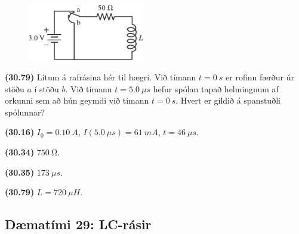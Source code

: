 \begin{enumerate}[label = \textbf{(\alph*)}]

\vspace{0.3cm}

\begin{minipage}{\linewidth}
\begin{figure}
\vspace{-0.5cm}
\includegraphics[width = 2in]{figures/rk3079.pdf}
\end{figure}

\item[\textbf{(30.79)}] Lítum á rafrásina hér til hægri. Við tímann $t = \SI{0}{s}$ er rofinn færður úr stöðu $a$ í stöðu $b$. Við tímann $t = \SI{5.0}{\mu s}$ hefur spólan tapað helmingnum af orkunni sem að hún geymdi við tímann $t = \SI{0}{s}$. Hvert er gildið á spanstuðli spólunnar?

\end{minipage}


\end{enumerate}

\vspace{0.75cm}

\begin{tcolorbox}
\begin{enumerate*}[label = ]
  \item \textbf{(30.16)} $I_0 = \SI{0.10}{A}$, $I(\SI{5.0}{\mu s}) = \SI{61}{mA}$, $t = \SI{46}{\mu s}$.
  \item \textbf{(30.34)} $\SI{750}{\ohm}$.
  \item \textbf{(30.35)} $\SI{173}{\mu s}$. \\
  \item \textbf{(30.79)} $L = \SI{720}{\mu H}$.
\end{enumerate*}
\end{tcolorbox}

\newpage

\subsection*{Dæmatími 29: LC-rásir}

